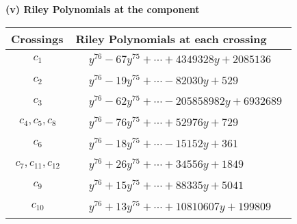 \documentclass[1p]{elsarticle_modified}
\theoremstyle{definition}
\begin{document}
\newpage\renewcommand{\arraystretch}{1}
\flushleft \textbf{(v) Riley Polynomials at the component}\newline \\
\begin{tabular}{m{50pt}|m{274pt}}
Crossings & \hspace{64pt}Riley Polynomials at each crossing \\
\hline $$\begin{aligned}c_{1}\end{aligned}$$&$\begin{aligned}
&y^{76}-67 y^{75}+\cdots+4349328 y+2085136
\end{aligned}$\\
\hline $$\begin{aligned}c_{2}\end{aligned}$$&$\begin{aligned}
&y^{76}-19 y^{75}+\cdots-82030 y+529
\end{aligned}$\\
\hline $$\begin{aligned}c_{3}\end{aligned}$$&$\begin{aligned}
&y^{76}-62 y^{75}+\cdots-205858982 y+6932689
\end{aligned}$\\
\hline $$\begin{aligned}c_{4},c_{5},c_{8}\end{aligned}$$&$\begin{aligned}
&y^{76}-76 y^{75}+\cdots+52976 y+729
\end{aligned}$\\
\hline $$\begin{aligned}c_{6}\end{aligned}$$&$\begin{aligned}
&y^{76}-18 y^{75}+\cdots-15152 y+361
\end{aligned}$\\
\hline $$\begin{aligned}c_{7},c_{11},c_{12}\end{aligned}$$&$\begin{aligned}
&y^{76}+26 y^{75}+\cdots+34556 y+1849
\end{aligned}$\\
\hline $$\begin{aligned}c_{9}\end{aligned}$$&$\begin{aligned}
&y^{76}+15 y^{75}+\cdots+88335 y+5041
\end{aligned}$\\
\hline $$\begin{aligned}c_{10}\end{aligned}$$&$\begin{aligned}
&y^{76}+13 y^{75}+\cdots+10810607 y+199809
\end{aligned}$\\
\hline
\end{tabular}\\~\\
\end{document}
